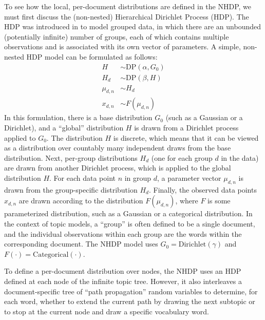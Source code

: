 \documentclass{article}
\begin{document}

To see how the local, per-document distributions are defined in the NHDP, we must first discuss the (non-nested) Hierarchical Dirichlet Process (HDP).
The HDP was introduced in \cite{teh2005hdp} to model grouped data, in which there are an unbounded (potentially infinite) number of groups, each of which contains multiple observations and is associated with its own vector of parameters.
A simple, non-nested HDP model can be formulated as follows:
\begin{align}
H &\sim \text{DP}(\alpha, G_0) \\
H_d &\sim \text{DP}(\beta, H) \\
\mu_{d,n} &\sim H_d \\
x_{d,n} &\sim F(\mu_{d,n})
\end{align}
In this formulation, there is a base distribution $G_0$ (such as a Gaussian or a Dirichlet), and a ``global'' distribution $H$ is drawn from a Dirichlet process applied to $G_0$.
The distribution $H$ is discrete, which means that it can be viewed as a distribution over countably many independent draws from the base distribution.
Next, per-group distributions $H_d$ (one for each group $d$ in the data) are drawn from another Dirichlet process, which is applied to the global distribution $H$.
For each data point $n$ in group $d$, a parameter vector $\mu_{d,n}$ is drawn from the group-specific distribution $H_d$.
Finally, the observed data points $x_{d,n}$ are drawn according to the distribution $F(\mu_{d,n})$, where $F$ is some parameterized distribution, such as a Gaussian or a categorical distribution.
In the context of topic models, a ``group'' is often defined to be a single document, and the individual observations within each group are the words within the corresponding document.
The NHDP model uses $G_0 = \text{Dirichlet}(\gamma)$ and $F(\cdot) = \text{Categorical}(\cdot)$.

To define a per-document distribution over nodes, the NHDP uses an HDP defined at each node of the infinite topic tree.
However, it also interleaves a document-specific tree of ``path propagation'' random variables to determine, for each word, whether to extend the current path by drawing the next subtopic or to stop at the current node and draw a specific vocabulary word.
\end{document}
